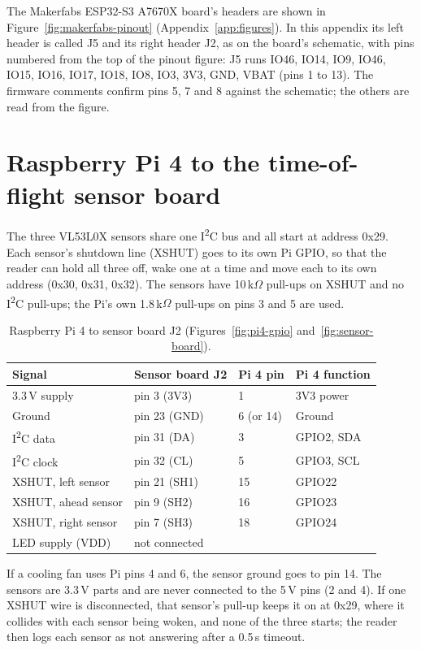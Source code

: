 The Makerfabs ESP32-S3 A7670X board's headers are shown in Figure~\ref{fig:makerfabs-pinout} (Appendix~\ref{app:figures}). In this appendix its left header is called J5 and its right header J2, as on the board's schematic, with pins numbered from the top of the pinout figure: J5 runs IO46, IO14, IO9, IO46, IO15, IO16, IO17, IO18, IO8, IO3, 3V3, GND, VBAT (pins 1 to 13). The firmware comments confirm pins 5, 7 and 8 against the schematic; the others are read from the figure.

\section{Raspberry Pi 4 to the time-of-flight sensor board}

The three VL53L0X sensors share one I\textsuperscript{2}C bus and all start at address 0x29. Each sensor's shutdown line (XSHUT) goes to its own Pi GPIO, so that the reader can hold all three off, wake one at a time and move each to its own address (0x30, 0x31, 0x32). The sensors have 10\,k$\Omega$ pull-ups on XSHUT and no I\textsuperscript{2}C pull-ups; the Pi's own 1.8\,k$\Omega$ pull-ups on pins 3 and 5 are used.

\begin{table}[htbp]
\centering
\caption{Raspberry Pi 4 to sensor board J2 (Figures~\ref{fig:pi4-gpio} and~\ref{fig:sensor-board}).}
\label{tab:wiring-tof}
\begin{tabular}{|l|l|l|l|}
\hline
\textbf{Signal} & \textbf{Sensor board J2} & \textbf{Pi 4 pin} & \textbf{Pi 4 function} \\ \hline
3.3\,V supply & pin 3 (3V3) & 1 & 3V3 power \\ \hline
Ground & pin 23 (GND) & 6 (or 14) & Ground \\ \hline
I\textsuperscript{2}C data & pin 31 (DA) & 3 & GPIO2, SDA \\ \hline
I\textsuperscript{2}C clock & pin 32 (CL) & 5 & GPIO3, SCL \\ \hline
XSHUT, left sensor & pin 21 (SH1) & 15 & GPIO22 \\ \hline
XSHUT, ahead sensor & pin 9 (SH2) & 16 & GPIO23 \\ \hline
XSHUT, right sensor & pin 7 (SH3) & 18 & GPIO24 \\ \hline
LED supply (VDD) & not connected & & \\ \hline
\end{tabular}
\end{table}

If a cooling fan uses Pi pins 4 and 6, the sensor ground goes to pin 14. The sensors are 3.3\,V parts and are never connected to the 5\,V pins (2 and 4). If one XSHUT wire is disconnected, that sensor's pull-up keeps it on at 0x29, where it collides with each sensor being woken, and none of the three starts; the reader then logs each sensor as not answering after a 0.5\,s timeout.

